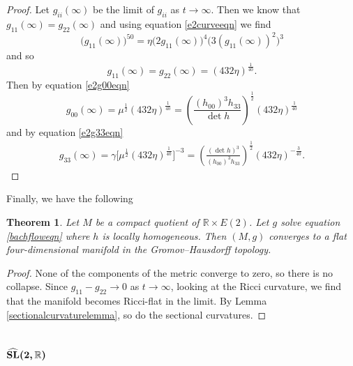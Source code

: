 \documentclass[10pt,a4paper]{amsart}
\numberwithin{equation}{section}
\newtheorem{Theorem}{Theorem}[section]
\begin{document}
\begin{proof}
Let $g_{ii}(\infty)$ be the limit of $g_{ii}$ as $t \rightarrow \infty$. Then we know that $g_{11}(\infty) = g_{22}(\infty)$ and using equation \eqref{e2curveeqn} we find
\[
\bigl(g_{11}(\infty)\bigr)^{50} = \eta \bigl(2g_{11}(\infty)\bigr)^4 \bigl(3 (g_{11}(\infty))^2 \bigr)^3
\]
and so
\[
g_{11}(\infty) = g_{22}(\infty) = (432 \eta)^{\frac{1}{40}}.
\]
Then by equation \eqref{e2g00eqn}
\[
g_{00}(\infty) = \mu^{\frac{1}{2}} (432 \eta)^{\frac{1}{40}}
			= \left(\frac{(h_{00})^3 h_{33}}{\det h} \right)^{\frac{1}{2}} (432 \eta)^{\frac{1}{40}}
\]
and by equation \eqref{e2g33eqn}
\begin{gather*}
g_{33}(\infty) = \gamma \bigl[\mu^{\frac{1}{2}} (432 \eta)^{\frac{1}{40}}\bigr]^{-3}
			= \left( \frac{(\det h)^{3}}{(h_{00})^{3} h_{33}} \right)^{\frac{1}{2}} (432 \eta)^{-\frac{3}{40}}.\tag*{\qed}
\end{gather*} \renewcommand{\qed}{}
\end{proof}

Finally, we have the following

\begin{Theorem}
Let $M$ be a compact quotient of $\mathbb{R} \times E(2)$. Let $g$ solve equation \eqref{bachfloweqn} where $h$ is locally homogeneous. Then $(M, g)$ converges to a flat four-dimensional manifold in the Gromov--Hausdorff topology.
\end{Theorem}


\begin{proof}
None of the components of the metric converge to zero, so there is no collapse. Since $g_{11} - g_{22} \rightarrow 0$ as $t \rightarrow \infty$, looking at the Ricci curvature, we find that the manifold becomes Ricci-flat in the limit. By Lemma \ref{sectionalcurvaturelemma}, so do the sectional curvatures.
\end{proof}

\subsection[$\widehat{{\rm SL}}(2,\mathbb{R})$]{$\boldsymbol{\widehat{{\rm SL}}(2,\mathbb{R})}$} \label{sl2rsection}
\end{document}
